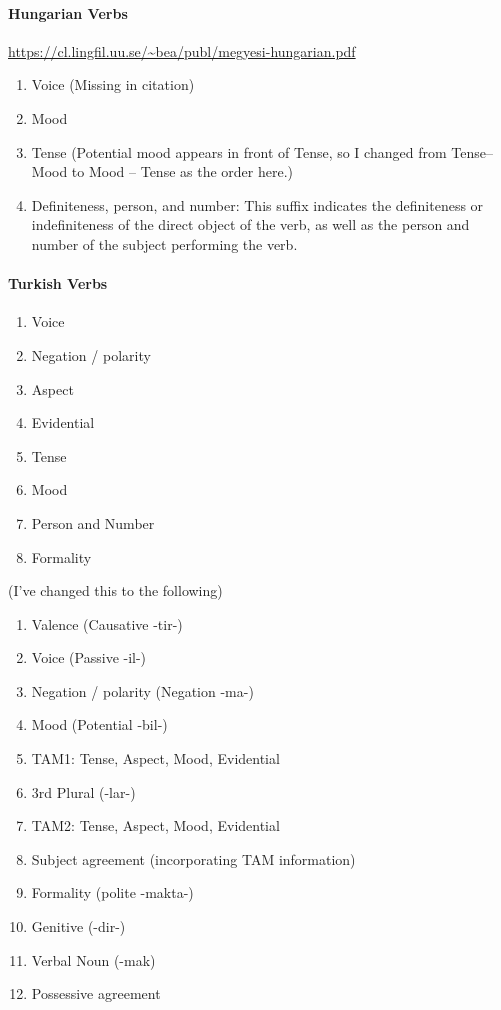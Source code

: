 \documentclass[11pt,letterpaper]{article}
\newcommand\mhahn[1]{{\color{red}(#1)}}
\newcommand\becky[1]{{\color{blue}(#1)}}
\begin{document}
\paragraph{Hungarian Verbs} \url{https://cl.lingfil.uu.se/~bea/publ/megyesi-hungarian.pdf}
\begin{enumerate}
    \item Voice \becky{Missing in citation}
    \item Mood
    \item Tense \mhahn{Potential mood appears in front of Tense, so I changed from Tense--Mood to Mood -- Tense as the order here.}
    \item Definiteness, person, and number: This suffix indicates the definiteness or indefiniteness of the direct object of the verb, as well as the person and number of the subject performing the verb. 
\end{enumerate}

\paragraph{Turkish Verbs}
\begin{enumerate}
    \item Voice
    \item Negation / polarity
    \item Aspect
    \item Evidential 
    \item Tense 
    \item Mood 
    \item Person and Number
    \item Formality
\end{enumerate}

\mhahn{I've changed this to the following}
\begin{enumerate}
    \item Valence (Causative -tir-)
    \item Voice (Passive -il-)
    \item Negation / polarity (Negation -ma-)
    \item Mood (Potential -bil-)
    \item TAM1: Tense, Aspect, Mood, Evidential
    \item 3rd Plural (-lar-)
    \item TAM2: Tense, Aspect, Mood, Evidential
    \item Subject agreement (incorporating TAM information)
    \item Formality (polite -makta-)
    \item Genitive (-dir-)
    \item Verbal Noun (-mak)
    \item Possessive agreement
\end{enumerate}
\end{document}
